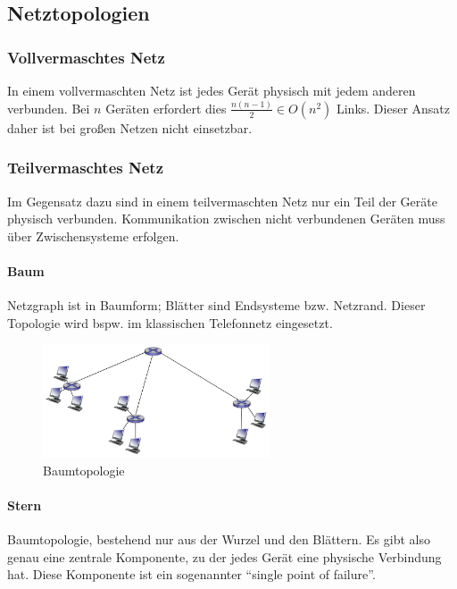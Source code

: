 \documentclass[a4paper, 14pt]{article}
\begin{document}
	\subsection{Netztopologien}

	\subsubsection{Vollvermaschtes Netz}

	In einem vollvermaschten Netz ist jedes Gerät physisch mit jedem anderen verbunden.
	Bei $n$ Geräten erfordert dies $\frac{n(n - 1)}{2} \in O(n^2)$ Links.
	Dieser Ansatz daher ist bei großen Netzen nicht einsetzbar.

	\subsubsection{Teilvermaschtes Netz}

	Im Gegensatz dazu sind in einem teilvermaschten Netz nur ein Teil der Geräte physisch verbunden.
	Kommunikation zwischen nicht verbundenen Geräten muss über Zwischensysteme erfolgen.

	\paragraph{Baum}

	Netzgraph ist in Baumform; Blätter sind Endsysteme bzw. Netzrand.
	Dieser Topologie wird bspw. im klassischen Telefonnetz eingesetzt.

	\begin{figure}
		\begin{center}
			\includegraphics[width=0.6\textwidth]{images/04-tree-topology.png}
		\end{center}
		\caption{Baumtopologie}
	\end{figure}

	\paragraph{Stern}

	Baumtopologie, bestehend nur aus der Wurzel und den Blättern.
	Es gibt also genau eine zentrale Komponente, zu der jedes Gerät eine physische Verbindung hat.
	Diese Komponente ist ein sogenannter \enquote{single point of failure}.
\end{document}
